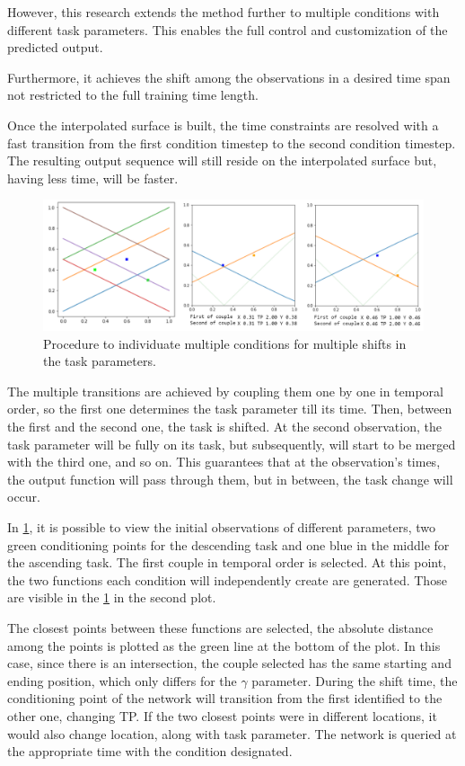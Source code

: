However, this research extends the method further to multiple conditions with different task parameters. This enables the full control and customization of the predicted output. 

Furthermore, it achieves the shift among the observations in a desired time span not restricted to the full training time length. 

Once the interpolated surface is built, the time constraints are resolved with a fast transition from the first condition timestep to the second condition timestep. The resulting output sequence will still reside on the interpolated surface but, having less time, will be faster.

\begin{figure}
    \centering
    \includegraphics[width=0.95\linewidth]{figures/tp-multiple-shift.png}
    \caption{ Procedure to individuate multiple conditions for multiple shifts in the task parameters. }
    \label{fig:tp-multiple-shift}
\end{figure}

The multiple transitions are achieved by coupling them one by one in temporal order, so the first one determines the task parameter till its time. Then, between the first and the second one, the task is shifted. At the second observation, the task parameter will be fully on its task, but subsequently, will start to be merged with the third one, and so on. This guarantees that at the observation's times, the output function will pass through them, but in between, the task change will occur.  

In \cref{fig:tp-multiple-shift}, it is possible to view the initial observations of different parameters, two green conditioning points for the descending task and one blue in the middle for the ascending task. The first couple in temporal order is selected. At this point, the two functions each condition will independently create are generated. Those are visible in the \cref{fig:tp-multiple-shift} in the second plot. 

The closest points between these functions are selected, the absolute distance among the points is plotted as the green line at the bottom of the plot. In this case, since there is an intersection, the couple selected has the same starting and ending position, which only differs for the $\gamma$ parameter. During the shift time, the conditioning point of the network will transition from the first identified to the other one, changing TP. If the two closest points were in different locations, it would also change location, along with task parameter. 
The network is queried at the appropriate time with the condition designated.

